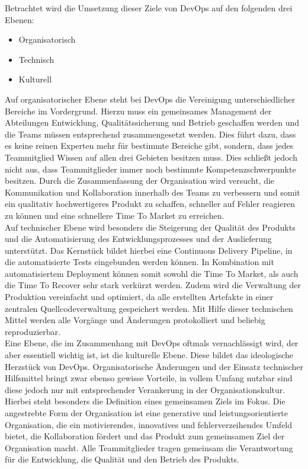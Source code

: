 Betrachtet wird die Umsetzung dieser Ziele von DevOps auf den folgenden drei Ebenen: 

\begin{itemize}
\item Organisatorisch
\item Technisch
\item Kulturell
\end{itemize}

Auf organisatorischer Ebene steht bei DevOps die Vereinigung unterschiedlicher Bereiche im Vordergrund. Hierzu muss ein gemeinsames Management der Abteilungen Entwicklung, Qualitätssicherung und Betrieb geschaffen werden und die Teams müssen entsprechend zusammengesetzt werden. Dies führt dazu, dass es keine reinen Experten mehr für bestimmte Bereiche gibt, sondern, dass jedes Teammitglied Wissen auf allen drei Gebieten besitzen muss. Dies schließt jedoch nicht aus, dass Teammitglieder immer noch bestimmte Kompetenzschwerpunkte besitzen. Durch die Zusammenfassung der Organisation wird versucht, die Kommunikation und Kollaboration innerhalb des Teams zu verbessern und somit ein qualitativ hochwertigeres Produkt zu schaffen, schneller auf Fehler reagieren zu können und eine schnellere Time To Market zu erreichen.\\
Auf technischer Ebene wird besonders die Steigerung der Qualität des Produkts und die Automatisierung des Entwicklungsprozesses und der Auslieferung unterstützt. Das Kernstück bildet hierbei eine Continuous Delivery Pipeline, in die automatisierte Tests eingebunden werden können. In Kombination mit automatisiertem Deployment können somit sowohl die Time To Market, als auch die Time To Recover sehr stark verkürzt werden. Zudem wird die Verwaltung der Produktion vereinfacht und optimiert, da alle erstellten Artefakte in einer zentralen Quellcodeverwaltung gespeichert werden. Mit Hilfe dieser technischen Mittel werden alle Vorgänge und Änderungen protokolliert und beliebig reproduzierbar.\\
Eine Ebene, die im Zusammenhang mit DevOps oftmals vernachlässigt wird, der aber essentiell wichtig ist, ist die kulturelle Ebene. Diese bildet das ideologische Herzstück von DevOps. Organisatorische Änderungen und der Einsatz technischer Hilfsmittel bringt zwar ebenso gewisse Vorteile, in vollem Umfang nutzbar sind diese jedoch nur mit entsprechender Verankerung in der Organisationskultur. Hierbei steht besonders die Definition eines gemeinsamen Ziels im Fokus. Die angestrebte Form der Organisation ist eine generative und leistungsorientierte Organisation, die ein motivierendes, innovatives und fehlerverzeihendes Umfeld bietet, die Kollaboration fördert und das Produkt zum gemeinsamen Ziel der Organisation macht. Alle Teammitglieder tragen gemeinsam die Verantwortung für die Entwicklung, die Qualität und den Betrieb des Produkts.

